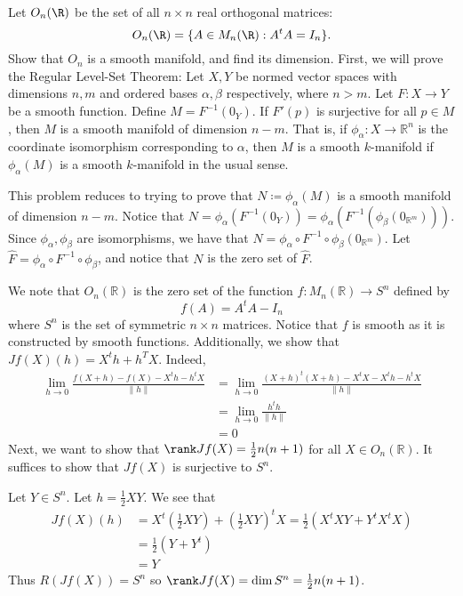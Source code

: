 \documentclass{../../../tex-setup/eh-homework}
\begin{document}
    \begin{question}{40}
        Let $O_n(\R)$ be the set of all $n\times n$ real orthogonal matrices:
        \[ O_n(\R) = \{A\in M_n(\R) : A^tA=I_n\}. \]
        Show that $O_n$ is a smooth manifold, and find its dimension.
        \tcblower
        First, we will prove the Regular Level-Set Theorem:
        \smallbreak
        Let \(X,Y\) be normed vector spaces with dimensions \(n,m\) and ordered bases \(\alpha ,\beta\) respectively, where \(n > m\). Let \(F: X \to Y\) be a smooth function. Define \(M = F^{-1} (0_Y)\). If \(F'(p)\) is surjective for all \(p \in M\), then \(M\) is a smooth manifold of dimension \(n - m\). That is, if \(\phi _\alpha : X \to \mathbb{R}^n\) is the coordinate isomorphism corresponding to \(\alpha\), then \(M\) is a smooth \(k\)-manifold if \(\phi _\alpha (M)\) is a smooth \(k\)-manifold in the usual sense.
        \smallbreak

        This problem reduces to trying to prove that \(N \coloneqq \phi _\alpha (M)\) is a smooth manifold of dimension \(n-m\). Notice that \(N = \phi _\alpha (F^{-1} (0_Y)) = \phi _\alpha (F^{-1} (\phi _\beta (0_{\mathbb{R}^m})))\). Since \(\phi _\alpha , \phi _\beta\) are isomorphisms, we have that \(N = \phi _\alpha \circ F^{-1} \circ \phi _\beta (0_{\mathbb{R}^m})\). Let \(\hat{F} = \phi _\alpha \circ F^{-1} \circ \phi _\beta\), and notice that \(N\) is the zero set of \(\hat{F}\).

        We note that \(O_n(\mathbb{R})\) is the zero set of the function \(f: M_n(\mathbb{R}) \to S^n\) defined by
        \[
            f(A) = A^t A - I_n
        \]
        where \(S^n\) is the set of symmetric \(n\times n\) matrices. Notice that \(f\) is smooth as it is constructed by smooth functions. Additionally, we show that \(Jf(X)(h) = X^t h + h^T X\). Indeed,
        \begin{align*}
            \lim_{h \to 0} \frac{f(X + h) - f(X) - X^t h - h^t X}{\|h\|} &= \lim_{h \to 0} \frac{(X + h)^t (X + h) - X^t X - X^t h - h^t X}{\|h\|} \\
            &= \lim_{h \to 0} \frac{h^t h}{\|h\|} \\
            &= 0
        \end{align*}
        Next, we want to show that \(\rank Jf(X) = \frac{1}{2}n(n+1)\) for all \(X \in O_n(\mathbb{R})\). It suffices to show that \(Jf(X)\) is surjective to \(S^n\).

        Let \(Y \in S^n\). Let \(h = \frac{1}{2}XY\). We see that
        \begin{align*}
            Jf(X)(h) &= X^t \left( \frac{1}{2}XY \right) + \left( \frac{1}{2}XY \right)^t X = \frac{1}{2}\left( X^t XY + Y^t X^t X \right) \\
            &= \frac{1}{2}(Y + Y^t) \tag{\(X\) is orthogonal} \\
            &= Y \tag{\(Y\) is symmetric}
        \end{align*}
        Thus \(R(Jf(X)) = S^n\) so \(\rank Jf(X) = \dim S^n = \frac{1}{2}n(n+1)\).


\end{question}
\end{document}
